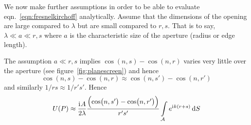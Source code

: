 We now make further assumptions in order to be able to evaluate eqn.~\eqref{eqn:fresnelkirchoff} analytically.
%
Assume that the dimensions of the opening are large compared to \(\lambda \) but are small compared to \(r,s\). 
%
That is to say, \(\lambda \ll a \ll r,s\) where \(a\) is the characteristic size of the aperture (radius or edge length).

%
The assumption \(a \ll r,s\) implies \(\cos(n, s) - \cos(n, r)\) varies very little over the aperture (see figure~\ref{fig:planescreen}) and hence
\begin{equation}
    \cos(n, s) - \cos(n, r) \approx  \cos(n, s') - \cos(n, r')
\end{equation}
%
and similarly \(1/rs \approx 1/r's'\).
%
Hence
%
\begin{equation}
    U(P) \approx \frac{\iu A}{2 \lambda} \frac{\left(\cos(n, s') - \cos(n, r') \right) }{r's'}\int\limits_{\mathcal{A}} e^{\iu k (r+s)} \dif S \label{eqn:fresnelapprox}
\end{equation}

